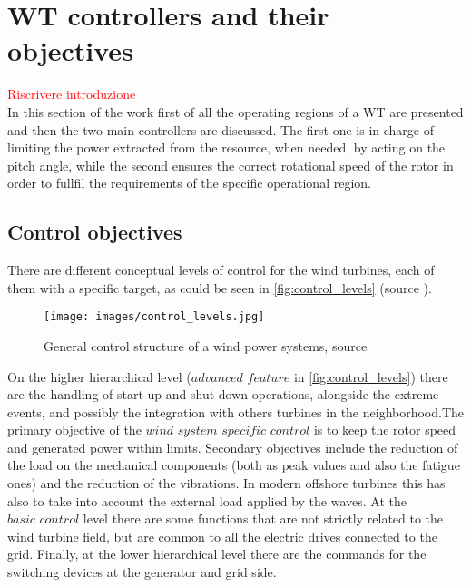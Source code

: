 \section{WT controllers and their objectives} \label{sec:control_objective}
\textcolor{red}{Riscrivere introduzione}\\
In this section of the work first of all the operating regions of a WT are presented and then the two main controllers are discussed. The first one is in charge of limiting the power extracted from the resource, when needed, by acting on the pitch angle, while the second ensures the correct rotational speed of the rotor in order to fullfil the requirements of the specific operational region.

\subsection{Control objectives}
There are different conceptual levels of control for the wind turbines, each of them with a specific target, as could be seen in \autoref{fig:control_levels} (source \cite{9535421}).
\begin{figure}[htb]
  \centering
  \texttt{[image: images/control\_levels.jpg]}
  \caption{General control structure of a wind power systems,  source \cite{9535421}}
  \label{fig:control_levels}
\end{figure}

On the higher hierarchical level ($\textit{advanced feature}$ in \autoref{fig:control_levels}) there are the handling of start up and shut down operations, alongside the extreme events, and possibly the integration with others turbines in the neighborhood.The primary objective of the $\textit{wind system specific control}$ is to keep the rotor speed and generated power within limits. Secondary objectives include the reduction of the load on the mechanical components (both as peak values and also the fatigue ones) and the reduction of the vibrations. In modern offshore turbines this has also to take into account the external load applied by the waves. At the $\textit{basic control}$ level there are some functions that are not strictly related to the wind turbine field, but are common to all the electric drives connected to the grid. Finally, at the lower hierarchical level there are the commands for the switching devices at the generator and grid side. 


